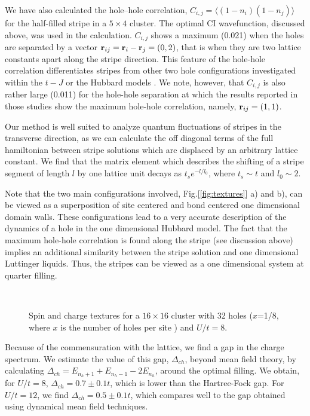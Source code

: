 We have also calculated the hole--hole 
correlation, $C_{i,j}=\langle ( 1 - n_i ) ( 1 - n_j ) \rangle$ 
for the half-filled stripe in a 
$5 \times 4$ cluster. The optimal CI wavefunction, 
discussed above, was used in the calculation. $C_{i,j}$
shows a maximum (0.021) when the holes are separated by a
vector  ${\bf r}_{ij}={\bf r}_i-{\bf r}_j=(0,2)$, that is when they are
two lattice constants apart along the stripe direction.
This feature of the hole-hole correlation differentiates stripes from
other two hole configurations investigated within the $t-J$ \cite{RD97} or the
Hubbard models \cite{FO90,LG98}. We note, however, that $C_{i,j}$ is also rather
large (0.011) for the hole-hole separation at which the results 
reported in those studies show the maximum hole-hole correlation, namely,
${\bf r}_{ij}=(1,1)$.

Our method is well suited to analyze quantum fluctuations of stripes in the
transverse direction, as we can calculate the off diagonal terms of the
full hamiltonian between stripe solutions which are displaced by an arbitrary
lattice constant. We find that the matrix element which describes the 
shifting of a stripe segment of length $l$ 
by one lattice unit decays as $t_s e^{-l/l_0}$, where
$t_s \sim t$ and $l_0 \sim 2$.


Note that the two main configurations involved,
Fig.[\ref{fig:textures}] a) and b), can be viewed as a superposition of 
site centered and bond centered one dimensional domain walls\cite{BJ00}.
These configurations lead to a very accurate description of the
dynamics of a hole in the one dimensional Hubbard model\cite{BJ00}.
The fact that the 
maximum hole-hole correlation
is found along the stripe (see discussion above)
implies an additional similarity
between the stripe solution and one dimensional Luttinger liquids.
Thus, the stripes can be viewed as a one dimensional system 
at quarter filling. 
\begin{figure}
\begin{center}
\mbox{\epsfxsize 8cm }
\end{center}
\caption{Spin and charge textures for a $16 \times 16$ cluster with 32
holes ($x$=1/8, where $x$ is the number of
holes per site ) and $U/t = 8$.}
\label{fig:cluster16}
\end{figure}
Because of the commensuration with the lattice,
we find a gap in the charge spectrum. We estimate the value of this
gap, $\Delta_{ch}$, beyond mean field theory,
by calculating $\Delta_{ch} = E_{n_h + 1}
+ E_{n_h - 1} - 2 E_{n_h}$, around the optimal filling.
We obtain, for $U/t = 8$, $\Delta_{ch} = 0.7 \pm 0.1 t$, which is lower
than the Hartree-Fock gap. For $U/t = 12$,
we find $\Delta_{ch} = 0.5 \pm 0.1 t$,
which compares well to the gap obtained using dynamical mean field
techniques\cite{Fetal99}. 

